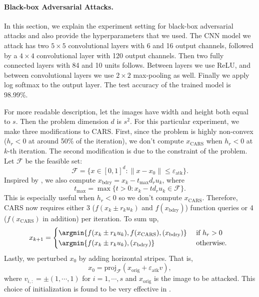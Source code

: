 \paragraph{Black-box Adversarial Attacks.}
In this section, we explain the experiment setting for black-box adversarial attacks and also provide the hyperparameters that we used.
The CNN model we attack has two $5\times5$ convolutional layers with 6 and 16 output channels, followed by a $4\times 4$ convolutional layer with 120 output channels. Then two fully connected layers with 84 and 10 units follows. Between layers we use ReLU, and between convolutional layers we use $2\times 2$ max-pooling as well. Finally we apply log softmax to the output layer.
The test accuracy of the trained model is 98.99\%.

For more readable description, let the images have width and height both equal to $s$. Then the problem dimension $d$ is $s^2$. For this particular experiment, we make three modifications to CARS.
First, since the problem is highly non-convex ($h_r<0$ at around 50\% of the iteration), we don't compute $x_{\mathrm{CARS}}$ when $h_r < 0$ at $k$-th iteration.
The second modification is due to the constraint of the problem. Let $\mathcal{F}$ be the feasible set:
\begin{equation*}
    \mathcal{F} = \{x \in [0,1]^d : \|x-x_0\| \leq \varepsilon_{\mathrm{atk}} \}.
\end{equation*}
Inspired by \cite{andriushchenko2020square}, we also compute $x_{\mathrm{bdry}} = x_k - t_{\mathrm{max}}d_r u_k$, where
\begin{equation*}
    t_{\mathrm{max}} = \max \{ t > 0 : x_k - td_r u_k \in \mathcal{F}\}.
\end{equation*}
This is especially useful when $h_r < 0$ so we don't compute $x_{\mathrm{CARS}}$.
Therefore, CARS now requires either 3 ($f(x_k \pm r_k u_k)$ and $f(x_{\mathrm{bdry}})$) function queries or 
4 ($f(x_{\mathrm{CARS}})$ in addition) per iteration. To sum up,
\begin{align*}
    x_{k+1} = 
    \begin{cases}
        \argmin\{f(x_k \pm r_k u_k), f(x_{\mathrm{CARS}}), (x_{\mathrm{bdry}}) \} & \textrm{ if } h_r>0 \\
        \argmin\{f(x_k \pm r_k u_k), (x_{\mathrm{bdry}}) \} & \text{ otherwise. }
    \end{cases}
\end{align*}
Lastly, we perturbed $x_0$ by adding horizontal stripes. That is,
\begin{equation*}
    x_0 = \mathrm{proj}_{\mathcal{F}} (x_{\mathrm{orig}} + \varepsilon_{\mathrm{atk}} v),
\end{equation*}
where $v_{i,:} = \pm (1,\cdots,1)$ for $i=1,\cdots,s$ and $x_{\mathrm{orig}}$ is the image to be attacked. This choice of initialization is found to be very effective in \cite{andriushchenko2020square}.

